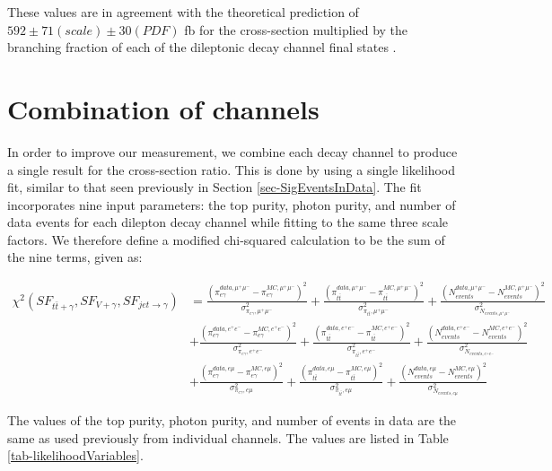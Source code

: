 These values are in agreement with the theoretical prediction of $592 \pm 71 (scale) \pm 30 (PDF)$ fb for the cross-section multiplied by the branching fraction of each of the dileptonic decay channel final states \cite{QCDcorrttgamma}.

\section{Combination of channels} \label{sec-CombinationOfChannels}

In order to improve our measurement, we combine each decay channel to produce a single result for the cross-section ratio. This is done by using a single likelihood fit, similar to that seen previously in Section \ref{sec-SigEventsInData}. The fit incorporates nine input parameters: the top purity, photon purity, and number of data events for each dilepton decay channel while fitting to the same three scale factors. We therefore define a modified chi-squared calculation to be the sum of the nine terms, given as:

\begin{equation}
\begin{split}
\chi^2(SF_{t\bar{t}+\gamma},SF_{V+\gamma},SF_{jet\to\gamma}) & = \frac{\left(\pi^{data,\mu^+\mu^-}_{e\gamma} - \pi^{MC,\mu^+\mu^-}_{e\gamma}\right)^2}{\sigma^2_{\pi_{e\gamma},\mu^+\mu^-}} + \frac{\left(\pi^{data,\mu^+\mu^-}_{t\bar{t}} - \pi^{MC,\mu^+\mu^-}_{t\bar{t}}\right)^2}{\sigma^2_{\pi_{t\bar{t}},\mu^+\mu^-}} + \frac{\left(N^{data,\mu^+\mu^-}_{events} - N^{MC,\mu^+\mu^-}_{events}\right)^2}{\sigma^2_{N_{events,\mu^+\mu^-}}} \\
& + \frac{\left(\pi^{data,e^+e^-}_{e\gamma} - \pi^{MC,e^+e^-}_{e\gamma}\right)^2}{\sigma^2_{\pi_{e\gamma},e^+e^-}} + \frac{\left(\pi^{data,e^+e^-}_{t\bar{t}} - \pi^{MC,e^+e^-}_{t\bar{t}}\right)^2}{\sigma^2_{\pi_{t\bar{t}},e^+e^-}} + \frac{\left(N^{data,e^+e^-}_{events} - N^{MC,e^+e^-}_{events}\right)^2}{\sigma^2_{N_{events,e^+e^-}}} \\
& + \frac{\left(\pi^{data,e\mu}_{e\gamma} - \pi^{MC,e\mu}_{e\gamma}\right)^2}{\sigma^2_{\pi_{e\gamma},e\mu}} + \frac{\left(\pi^{data,e\mu}_{t\bar{t}} - \pi^{MC,e\mu}_{t\bar{t}}\right)^2}{\sigma^2_{\pi_{t\bar{t}},e\mu}} + \frac{\left(N^{data,e\mu}_{events} - N^{MC,e\mu}_{events}\right)^2}{\sigma^2_{N_{events,e\mu}}} 
\end{split}
\end{equation}

The values of the top purity, photon purity, and number of events in data are the same as used previously from individual channels. The values are listed in Table \ref{tab-likelihoodVariables}.  

